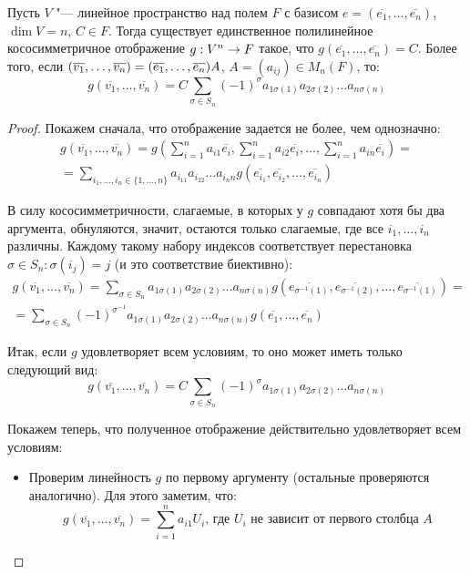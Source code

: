 \begin{theorem}
	Пусть $V$ "--- линейное пространство над полем $F$ с базисом $e = (\overline{e_1}, \dots, \overline{e_n})$, $\dim{V} = n$, $C \in F$. Тогда существует единственное полилинейное кососимметричное отображение $g: V^n \hm{\rightarrow} F$ такое, что $g(\overline{e_1}, \dots, \overline{e_n}) = C$. Более того, если $(\overline{v_1}, \dots, \overline{v_n}) \hm{=} (\overline{e_1}, \dots, \overline{e_n})A$, $A = (a_{ij}) \in M_n(F)$, то:
	\[g(\overline{v_1}, \dots, \overline{v_n}) = C\sum_{\sigma \in S_n}(-1)^\sigma a_{1 \sigma(1)}a_{2 \sigma(2)}\dots a_{n \sigma(n)}\]
\end{theorem}

\begin{proof}
	Покажем сначала, что отображение задается не более, чем однозначно:
	\begin{multline*}
		g(\overline{v_1}, \dots, \overline{v_n}) = g\left(\sum_{i = 1}^{n}a_{i1}\overline{e_i}, \sum_{i = 1}^{n}a_{i2}\overline{e_i}, \dots, \sum_{i = 1}^{n}a_{in}\overline{e_i}\right) = \\
		= \sum_{i_1, \dots, i_n \in \{1, \dots, n\}}a_{i_11}a_{i_22}\dots a_{i_nn}g(\overline{e_{i_1}}, \overline{e_{i_2}}, \dots, \overline{e_{i_n}})
	\end{multline*}
	
	В силу кососимметричности, слагаемые, в которых у $g$ совпадают хотя бы два аргумента, обнуляются, значит, остаются только слагаемые, где все $i_1, \dots, i_n$ различны. Каждому такому набору индексов соответствует перестановка $\sigma \in S_n: \sigma(i_j) = j$ (и это соответствие биективно):
	\begin{multline*}
		g(\overline{v_1}, \dots, \overline{v_n}) = \sum_{\sigma \in S_n}a_{1 \sigma(1)}a_{2 \sigma(2)}\dots a_{n \sigma(n)}g(\overline{e_{\sigma^{-1}(1)}}, \overline{e_{\sigma^{-1}(2)}}, \dots, \overline{e_{\sigma^{-1}(1)}}) = \\
		= \sum_{\sigma \in S_n}(-1)^{\sigma^{-1}}a_{1 \sigma(1)}a_{2 \sigma(2)}\dots a_{n \sigma(n)}g(\overline{e_1}, \dots, \overline{e_n})
	\end{multline*}
	
	Итак, если $g$ удовлетворяет всем условиям, то оно может иметь только следующий вид:
	\[g(\overline{v_1}, \dots, \overline{v_n}) = C\sum_{\sigma \in S_n}(-1)^\sigma a_{1 \sigma(1)}a_{2 \sigma(2)}\dots a_{n \sigma(n)}\]
		
	Покажем теперь, что полученное отображение действительно удовлетворяет всем условиям:
	\begin{itemize}
		\item Проверим линейность $g$ по первому аргументу (остальные проверяются аналогично). Для этого заметим, что:
		\[g(\overline{v_1}, \dots, \overline{v_n}) = \sum_{i = 1}^na_{i1}U_i\text{, где $U_i$ не зависит от первого столбца $A$}\]
		

\end{itemize}
\end{proof}

